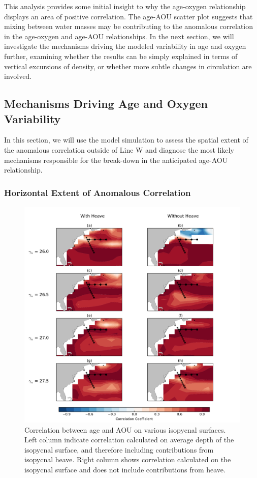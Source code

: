 This analysis provides some initial insight to why the age-oxygen relationship
displays an area of positive correlation. The age-AOU scatter plot suggests that
mixing between water masses may be contributing to the anomalous correlation in
the age-oxygen and age-AOU relationships. In the next section, we will investigate
the mechanisms driving the modeled variability in age and oxygen further,
examining whether the results can be simply explained in terms of vertical
excursions of density, or whether more subtle changes in circulation are involved.

\subsection{Mechanisms Driving Age and Oxygen Variability}
In this section, we will use the model simulation to assess the spatial extent of
the anomalous correlation outside of Line W and diagnose the most likely mechanisms
responsible for the break-down in the anticipated age-AOU relationship.

\subsubsection{Horizontal Extent of Anomalous Correlation}

\begin{figure}
\centering
\includegraphics[width=\linewidth]{age_aou_corr_iso_sfc.pdf}
\caption{Correlation between age and AOU on various isopycnal surfaces. Left column indicate correlation calculated on average depth of the isopycnal surface, and therefore including contributions from isopycnal heave. Right column shows correlation calculated on the isopycnal surface and does not include contributions from heave.}
\label{fig:iso_correlations}
\end{figure}

